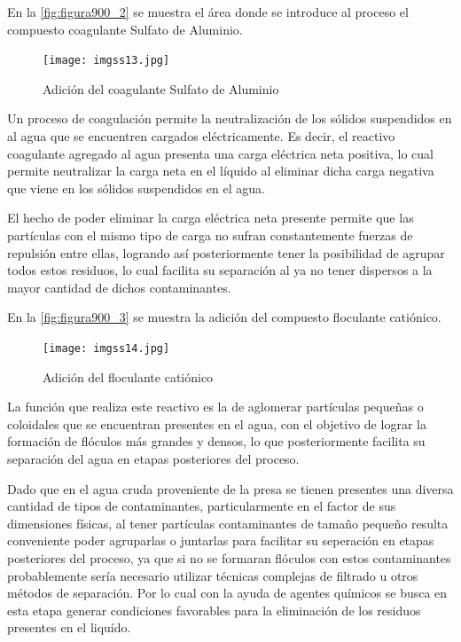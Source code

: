 En la \autoref{fig:figura900_2} se muestra el área donde se introduce al proceso el compuesto coagulante Sulfato de Aluminio. 

\begin{figure}[h]
	\centering
	\texttt{[image: imgss13.jpg]}
	\caption{Adición del coagulante Sulfato de Aluminio}
	\label{fig:figura900_2}
\end{figure}

\clearpage

Un proceso de coagulación permite la neutralización de los sólidos suspendidos en al agua que se encuentren cargados eléctricamente. Es decir, el reactivo coagulante 
agregado al agua presenta una carga eléctrica neta positiva, lo cual permite neutralizar la carga neta en el líquido al eliminar dicha carga negativa que viene en 
los sólidos suspendidos en el agua.

El hecho de poder eliminar la carga eléctrica neta presente permite que las partículas con el mismo tipo de carga no sufran constantemente fuerzas de repulsión entre ellas, logrando así posteriormente tener la posibilidad 
de agrupar todos estos residuos, lo cual facilita su separación al ya no tener dispersos a la mayor cantidad de dichos contaminantes.

En la \autoref{fig:figura900_3} se muestra la adición del compuesto floculante catiónico.

\begin{figure}[h]
	\centering
	\texttt{[image: imgss14.jpg]}
	\caption{Adición del floculante catiónico}
	\label{fig:figura900_3}
\end{figure}

La función que realiza este reactivo es la de aglomerar partículas pequeñas o coloidales que se encuentran presentes en el agua, con el objetivo de lograr la formación 
de flóculos más grandes y densos, lo que posteriormente facilita su separación del agua en etapas posteriores del proceso.

Dado que en el agua cruda proveniente de la presa se tienen presentes una diversa cantidad de tipos de contaminantes, particularmente en el factor de sus dimensiones físicas, al tener partículas contaminantes de tamaño pequeño 
resulta conveniente poder agruparlas o juntarlas para facilitar su seperación en etapas posteriores del proceso, ya que si no se formaran flóculos con estos contaminantes probablemente sería necesario utilizar técnicas complejas 
de filtrado u otros métodos de separación. Por lo cual con la ayuda de agentes químicos se busca en esta etapa generar condiciones favorables para la eliminación de los residuos presentes en el liquído.

